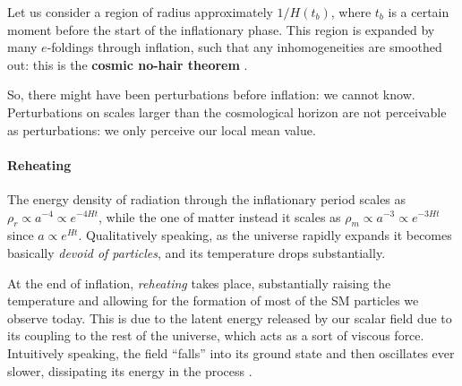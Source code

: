 \documentclass[main.tex]{subfiles}
\begin{document}

Let us consider a region of radius approximately \(1 / H(t_b)\), where \(t_b\) is a certain moment before the start of the inflationary phase.
This region is expanded by many \(e\)-foldings through inflation, such that any inhomogeneities are smoothed out: this is the \textbf{cosmic no-hair theorem} \cite[pag.\ 159]{colespCosmology2002}.



So, there might have been perturbations before inflation: we cannot know.
Perturbations on scales larger than the cosmological horizon are not perceivable as perturbations: we only perceive our local mean value.


\paragraph{Reheating}

The energy density of radiation through the inflationary period scales as \(\rho _r \propto a^{-4} \propto e^{-4 Ht}\), while the one of matter instead it scales as \(\rho _m \propto a^{-3} \propto e^{-3Ht}\) since \(a \propto e^{Ht}\).
Qualitatively speaking, as the universe rapidly expands it becomes basically \emph{devoid of particles}, and its temperature drops substantially.

At the end of inflation, \emph{reheating} takes place, substantially raising the temperature and allowing for the formation of most of the SM particles we observe today.
This is due to the latent energy released by our scalar field due to its coupling to the rest of the universe, which acts as a sort of viscous force.
Intuitively speaking, the field ``falls'' into its ground state and then oscillates ever slower, dissipating its energy in the process \cite[fig.\ 7.6]{colespCosmology2002}. 
\end{document}
